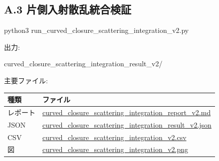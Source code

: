 \documentclass[
  a4paper,
]{article}
\newenvironment{Shaded}{}{}
\newcommand{\NormalTok}[1]{#1}
\newcounter{none} %
\begin{document}
\subsection{A.3
片側入射散乱統合検証}\label{a.3-ux7247ux5074ux5165ux5c04ux6563ux4e71ux7d71ux5408ux691cux8a3c}

\begin{Shaded}
\begin{Highlighting}[]
\NormalTok{python3 run\_curved\_closure\_scattering\_integration\_v2.py}
\end{Highlighting}
\end{Shaded}

出力:

\begin{Shaded}
\begin{Highlighting}[]
\NormalTok{curved\_closure\_scattering\_integration\_result\_v2/}
\end{Highlighting}
\end{Shaded}

主要ファイル:

{\def\LTcaptype{none} %
\begin{longtable}[]{@{}
  >{\raggedright\arraybackslash}p{}
  >{\raggedright\arraybackslash}p{}@{}}
\toprule\noalign{}
\begin{minipage}[b]{\linewidth}\raggedright
種類
\end{minipage} & \begin{minipage}[b]{\linewidth}\raggedright
ファイル
\end{minipage} \\
\midrule\noalign{}
\endhead
\bottomrule\noalign{}
\endlastfoot
レポート &
\href{curved_closure_scattering_integration_result_v2/curved_closure_scattering_integration_report_v2.md}{curved\_closure\_scattering\_integration\_report\_v2.md} \\
JSON &
\href{curved_closure_scattering_integration_result_v2/curved_closure_scattering_integration_result_v2.json}{curved\_closure\_scattering\_integration\_result\_v2.json} \\
CSV &
\href{curved_closure_scattering_integration_result_v2/curved_closure_scattering_integration_v2.csv}{curved\_closure\_scattering\_integration\_v2.csv} \\
図 &
\href{curved_closure_scattering_integration_result_v2/curved_closure_scattering_integration_v2.png}{curved\_closure\_scattering\_integration\_v2.png} \\
\end{longtable}
}
\end{document}
